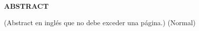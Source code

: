 

\begin{center}
    \textbf{ABSTRACT}
\end{center}
\vspace{1cm}

(Abstract en inglés que no debe exceder una página.) (Normal)
\newpage